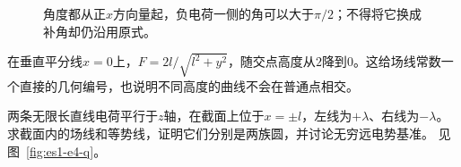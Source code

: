 \begin{solution}
\begin{figure}[H]
\begin{tikzpicture}[>=Stealth,line cap=round,line join=round]
\end{tikzpicture}
\caption{角度都从正$x$方向量起，负电荷一侧的角可以大于$\pi/2$；不得将它换成补角却仍沿用原式。}\label{fig:es1-e3-s}
\end{figure}


在垂直平分线$x=0$上，$F=2l/\sqrt{l^2+y^2}$，随交点高度从$2$降到$0$。这给场线常数一个直接的几何编号，也说明不同高度的曲线不会在普通点相交。
\end{solution}

\begin{example}[异号平行线电荷的两族圆]\label{ex:es1-e4}
两条无限长直线电荷平行于$z$轴，在截面上位于$x=\pm l$，左线为$+\lambda$、右线为$-\lambda$。求截面内的场线和等势线，证明它们分别是两族圆，并讨论无穷远电势基准。 见图~\ref{fig:es1-e4-q}。
\end{example}

